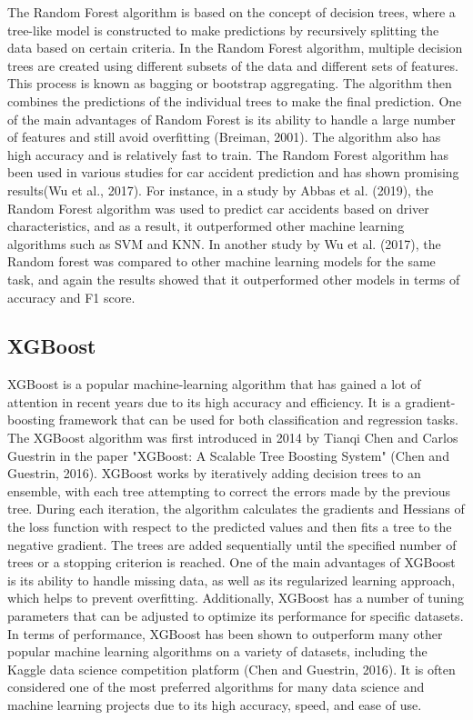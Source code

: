 \documentclass{IEEEtran}
\begin{document}
The Random Forest algorithm is based on the concept of decision trees, where a tree-like model is constructed to make predictions by recursively splitting the data based on certain criteria. In the Random Forest algorithm, multiple decision trees are created using different subsets of the data and different sets of features. This process is known as bagging or bootstrap aggregating. The algorithm then combines the predictions of the individual trees to make the final prediction. One of the main advantages of Random Forest is its ability to handle a large number of features and still avoid overfitting (Breiman, 2001). The algorithm also has high accuracy and is relatively fast to train. The Random Forest algorithm has been used in various studies for car accident prediction and has shown promising results(Wu et al., 2017). For instance, in a study by Abbas et al. (2019), the Random Forest algorithm was used to predict car accidents based on driver characteristics, and as a result, it outperformed other machine learning algorithms such as SVM and KNN. In another study by Wu et al. (2017), the Random forest was compared to other machine learning models for the same task, and again the results showed that it outperformed other models in terms of accuracy and F1 score.

\subsection{XGBoost}

XGBoost is a popular machine-learning algorithm that has gained a lot of attention in recent years due to its high accuracy and efficiency. It is a gradient-boosting framework that can be used for both classification and regression tasks. The XGBoost algorithm was first introduced in 2014 by Tianqi Chen and Carlos Guestrin in the paper "XGBoost: A Scalable Tree Boosting System" (Chen and Guestrin, 2016).
XGBoost works by iteratively adding decision trees to an ensemble, with each tree attempting to correct the errors made by the previous tree. During each iteration, the algorithm calculates the gradients and Hessians of the loss function with respect to the predicted values and then fits a tree to the negative gradient. The trees are added sequentially until the specified number of trees or a stopping criterion is reached. One of the main advantages of XGBoost is its ability to handle missing data, as well as its regularized learning approach, which helps to prevent overfitting. Additionally, XGBoost has a number of tuning parameters that can be adjusted to optimize its performance for specific datasets. In terms of performance, XGBoost has been shown to outperform many other popular machine learning algorithms on a variety of datasets, including the Kaggle data science competition platform (Chen and Guestrin, 2016). It is often considered one of the most preferred algorithms for many data science and machine learning projects due to its high accuracy, speed, and ease of use.
\end{document}

